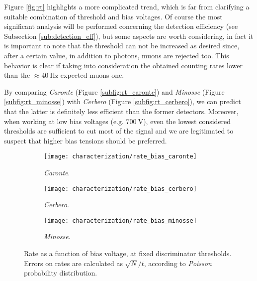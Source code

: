 Figure \ref{fig:rt} highlights a more complicated trend, which is far from clarifying a suitable combination of threshold and bias voltages. Of course the most significant analysis will be performed concerning the detection efficiency (see Subsection \ref{sub:detection_eff}), but some aspects are worth considering, in fact it is important to note that the threshold can not be increased as desired since, after a certain value, in addition to photons, muons are rejected too. This behavior is clear if taking into consideration the obtained counting rates lower than the $\approx\SI{40}{\hertz}$ expected muons one.

By comparing \emph{Caronte} (Figure \ref{subfig:rt_caronte}) and \emph{Minosse} (Figure \ref{subfig:rt_minosse}) with \emph{Cerbero} (Figure \ref{subfig:rt_cerbero}), we can predict that the latter is definitely less efficient than the former detectors. Moreover, when working at low bias voltages (e.g. $\SI{700}{\volt}$), even the lowest considered thresholds are sufficient to cut most of the signal and we are legitimated to suspect that higher bias tensions should be preferred.\\
\begin{figure}[!htp]
	\centering
	\begin{subfigure}{.5\linewidth}
		\centering
		\texttt{[image: characterization/rate\_bias\_caronte]}
		\caption{\emph{Caronte}.} 
		\label{subfig:rb_caronte}
	\end{subfigure}\hfill
	\begin{subfigure}{.5\linewidth}
		\centering
		\texttt{[image: characterization/rate\_bias\_cerbero]}
		\caption{\emph{Cerbero}.} 
		\label{subfig:rb_cerbero}
	\end{subfigure}\hfill
	\begin{subfigure}{.5\linewidth}
		\centering
		\texttt{[image: characterization/rate\_bias\_minosse]}
		\caption{\emph{Minosse}.} 
		\label{subfig:rb_minosse}
	\end{subfigure}
	\caption{Rate as a function of bias voltage, at fixed discriminator thresholds. Errors on rates are calculated as $\sqrt{N}/t$, according to \emph{Poisson} probability distribution.} 
	\label{fig:rb}
\end{figure}

